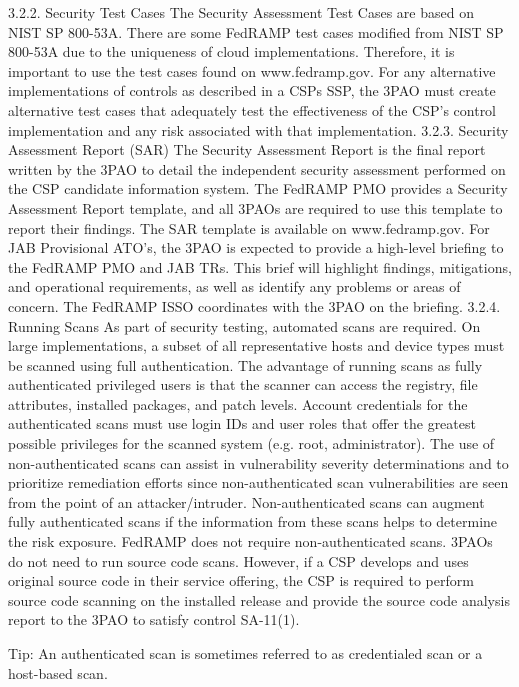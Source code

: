\documentclass[../main.tex]{subfiles}
\begin{document}
3.2.2. Security Test Cases
The Security Assessment Test Cases are based on NIST SP 800-53A.  There are some FedRAMP test cases modified from NIST SP 800-53A due to the uniqueness of cloud implementations.  Therefore, it is important to use the test cases found on www.fedramp.gov. 
For any alternative implementations of controls as described in a CSPs SSP, the 3PAO must create alternative test cases that adequately test the effectiveness of the CSP’s control implementation and any risk associated with that implementation.
3.2.3. Security Assessment Report (SAR) 
The Security Assessment Report is the final report written by the 3PAO to detail the independent security assessment performed on the CSP candidate information system.  The FedRAMP PMO provides a Security Assessment Report template, and all 3PAOs are required to use this template to report their findings.  The SAR template is available on www.fedramp.gov. 
For JAB Provisional ATO’s, the 3PAO is expected to provide a high-level briefing to the FedRAMP PMO and JAB TRs. This brief will highlight findings, mitigations, and operational requirements, as well as identify any problems or areas of concern.  The FedRAMP ISSO coordinates with the 3PAO on the briefing. 
3.2.4. Running Scans
As part of security testing, automated scans are required.  On large implementations, a subset of all representative hosts and device types must be scanned using full authentication.  The advantage of running scans as fully authenticated privileged users is that the scanner can access the registry, file attributes, installed packages, and patch levels.  Account credentials for the authenticated scans must use login IDs and user roles that offer the greatest possible privileges for the scanned system (e.g. root, administrator).  
The use of non-authenticated scans can assist in vulnerability severity determinations and to prioritize remediation efforts since non-authenticated scan vulnerabilities are seen from the point of an attacker/intruder.  Non-authenticated scans can augment fully authenticated scans if the information from these scans helps to determine the risk exposure.  FedRAMP does not require non-authenticated scans.
3PAOs do not need to run source code scans.  However, if a CSP develops and uses original source code in their service offering, the CSP is required to perform source code scanning on the installed release and provide the source code analysis report to the 3PAO to satisfy control SA-11(1).  

Tip: 	An authenticated scan is sometimes referred to as credentialed scan or a host-based scan.
\end{document}
